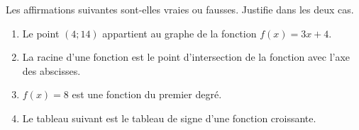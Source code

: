 %
%
    Les affirmations suivantes sont-elles vraies ou fausses. Justifie dans les deux cas.
    \begin{enumerate}
        \item Le point $(4;14)$ appartient au graphe de la fonction $f(x)=3x+4$.
        \item La racine d'une fonction est le point d'intersection de la fonction avec l'axe des abscisses.
        \item $f(x) = 8$ est une fonction du premier degré.
        \item Le tableau suivant est le tableau de signe d'une fonction croissante.
        \begin{center}
        \end{center}
    \end{enumerate}
